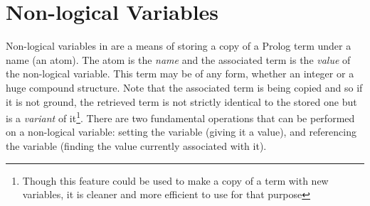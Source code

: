 \section{Non-logical Variables} 
Non-logical variables in {\eclipse} are a means of storing a copy
of a Prolog term under a name (an atom).
The atom is the {\it name} and the associated
term is the {\it value} of the non-logical variable.
This term may be of any form, whether an integer or a huge compound
structure.
Note that the associated term is being copied and so if it is not ground,
the retrieved term is not strictly identical to the stored one
but is a {\it variant} of it\footnote{
Though this feature could be used to make a copy of a term with new variables,
it is cleaner and more efficient to use  for that purpose}.
There are two fundamental operations that can be performed on a non-logical variable:
setting the variable (giving it a value), and referencing the variable
(finding the value currently associated with it).

